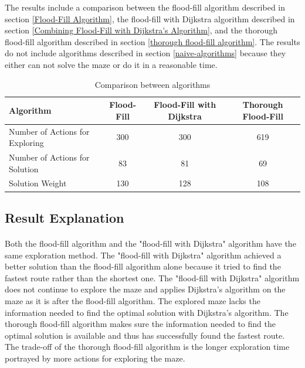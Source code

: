 \documentclass[12pt]{article}
\begin{document}
The results include a comparison between the flood-fill algorithm described in section \ref{Flood-Fill Algorithm}, the flood-fill with Dijkstra algorithm described in section \ref{Combining Flood-Fill with Dijkstra's Algorithm}, and the thorough flood-fill algorithm described in section \ref{thorough flood-fill algorithm}.
The results do not include algorithms described in section \ref{naive-algorithms} because they either can not solve the \gls{maze} or do it in a reasonable time.

\begin{table}[H]
    \centering
    \begin{tabular}{ | m{4cm} | c | c | c | }
    \hline
        Algorithm & Flood-Fill & Flood-Fill with Dijkstra & Thorough Flood-Fill \\
    \hline
         Number of Actions for Exploring & 300 & 300 & 619 \\
    \hline
         Number of Actions for Solution & 83 & 81 & 69 \\
    \hline
         Solution Weight & 130 & 128 & 108 \\
    \hline
    \end{tabular}
    \caption{Comparison between algorithms}
    \label{Results table}
\end{table}

\subsection{Result Explanation}
\paragraph{}
Both the flood-fill algorithm and the "flood-fill with Dijkstra" algorithm have the same exploration method.
The "flood-fill with Dijkstra" algorithm achieved a better solution than the flood-fill algorithm alone because it tried to find the fastest route rather than the shortest one.
The "flood-fill with Dijkstra" algorithm does not continue to explore the \gls{maze} and applies Dijkstra's algorithm on the \gls{maze} as it is after the flood-fill algorithm.
The explored \gls{maze} lacks the information needed to find the optimal solution with Dijkstra's algorithm.
The thorough flood-fill algorithm makes sure the information needed to find the optimal solution is available and thus has successfully found the fastest route.
The trade-off of the thorough flood-fill algorithm is the longer exploration time portrayed by more actions for exploring the \gls{maze}.
\end{document}
